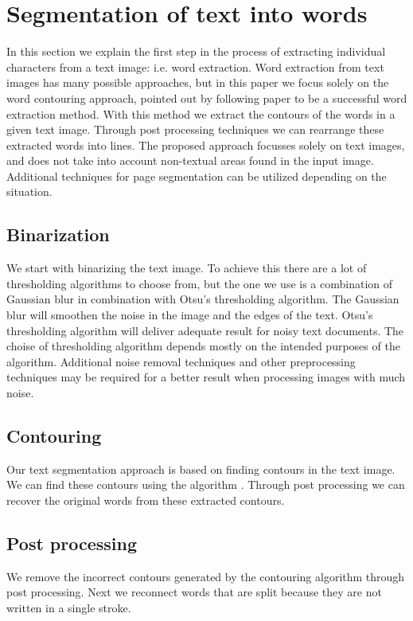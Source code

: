 \documentclass{article}
\begin{document}
\section{Segmentation of text into words}
\label{sec:segtext}
In this section we explain the first step in the process of extracting individual characters from a text image: i.e. word extraction.
Word extraction from text images has many possible approaches, but in this paper we focus solely on the word contouring approach, pointed out by following paper \cite{WordSegm} to be a successful word extraction method.
With this method we extract the contours of the words in a given text image. Through post processing techniques we can rearrange these extracted words into lines.
The proposed approach focusses solely on text images, and does not take into account non-textual areas found in the input image.
Additional techniques for page segmentation can be utilized depending on the situation.

\subsection{Binarization}
\label{sec:binartext}

We start with binarizing the text image. To achieve this there are a lot of thresholding algorithms to choose from, but the one we use is a combination of Gaussian blur in combination with Otsu's thresholding algorithm. \cite{Otsu79} 
The Gaussian blur will smoothen the noise in the image and the edges of the text.
Otsu's thresholding algorithm will deliver adequate result for noisy text documents.
The choise of thresholding algorithm depends mostly on the intended purposes of the algorithm.
Additional noise removal techniques and other preprocessing techniques may be required for a better result when processing images with much noise. 


\subsection{Contouring}
Our text segmentation approach is based on finding contours in the text image.
We can find these contours using the algorithm \cite{Suzuki85}.
Through post processing we can recover the original words from these extracted contours.

\subsection{Post processing}
We remove the incorrect contours generated by the contouring algorithm through post processing.
Next we reconnect words that are split because they are not written in a single stroke.
\end{document}
